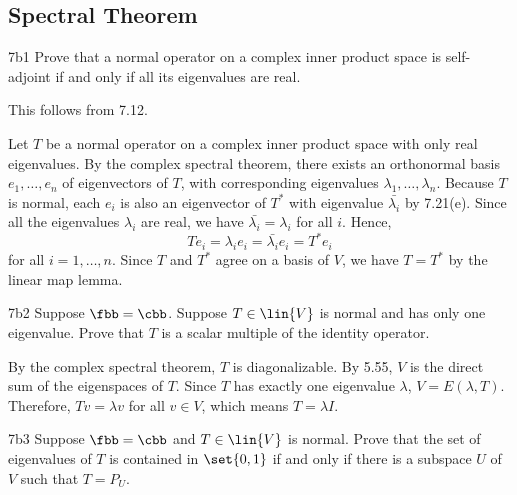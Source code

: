 \subsection{Spectral Theorem}

\begin{exercise}{7b1}
    Prove that a normal operator on a complex inner product space is self-adjoint if and only if all its eigenvalues are real.

\end{exercise}

\begin{soliff}
    \rightimp This follows from 7.12.

    \leftimp Let $T$ be a normal operator on a complex inner product space with only real eigenvalues.
    By the complex spectral theorem, there exists an orthonormal basis $e_1, \ldots, e_n$ of eigenvectors of $T$, with corresponding eigenvalues $\lambda_1, \ldots, \lambda_n$.
    Because $T$ is normal, each $e_i$ is also an eigenvector of $T^\ast$ with eigenvalue $\bar{\lambda_i}$ by 7.21(e).
    Since all the eigenvalues $\lambda_i$ are real, we have $\bar{\lambda_i} = \lambda_i$ for all $i$.
    Hence,
    \[
        T e_i = \lambda_i e_i = \bar{\lambda_i} e_i = T^\ast e_i
    \]
    for all $i = 1, \ldots, n$.
    Since $T$ and $T^\ast$ agree on a basis of $V$, we have $T = T^\ast$ by the linear map lemma.
\end{soliff}

\begin{exercise}{7b2}
    Suppose $\fbb = \cbb$.
    Suppose $T \in \lin{V}$ is normal and has only one eigenvalue.
    Prove that $T$ is a scalar multiple of the identity operator.
\end{exercise}

\begin{sol}
    By the complex spectral theorem, $T$ is diagonalizable.
    By 5.55, $V$ is the direct sum of the eigenspaces of $T$.
    Since $T$ has exactly one eigenvalue $\lambda$, $V = E(\lambda, T)$.
    Therefore, $Tv = \lambda v$ for all $v \in V$, which means $T = \lambda I$.
\end{sol}

\begin{exercise}{7b3}
    Suppose $\fbb = \cbb$ and $T \in \lin{V}$ is normal.
    Prove that the set of eigenvalues of $T$ is contained in $\set{0, 1}$ if and only if there is a subspace $U$ of $V$ such that $T = P_U$.
\end{exercise}

